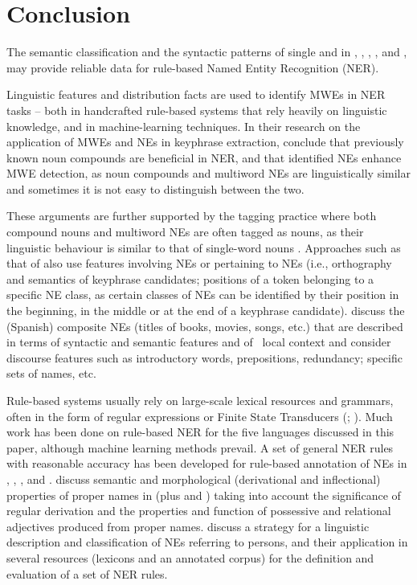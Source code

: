 \documentclass[output=paper]{langsci/langscibook}
\begin{document}
\section{Conclusion}

The semantic classification and the syntactic patterns of single and
 in , , , , and , may
provide reliable data for rule-based Named Entity Recognition (NER).



Linguistic features and distribution facts are used to identify MWEs in
NER tasks – both in handcrafted rule-based systems that rely heavily on
linguistic knowledge, and in machine-learning techniques. In their
research on the application of MWEs and NEs in keyphrase extraction,
\cite{nagy2011} conclude that previously known noun compounds are
beneficial in NER, and that identified NEs enhance MWE detection, as
noun compounds and multiword NEs are linguistically similar and
sometimes it is not easy to distinguish between the two.



These arguments are further supported by the tagging practice where both
compound nouns and multiword NEs are often tagged as nouns, as their
linguistic behaviour is similar to that of single-word nouns \citep{vincze2011}. Approaches such as that of \cite{nagy2011} also use
features involving NEs or pertaining to NEs (i.e., orthography and
semantics of keyphrase candidates; positions of a token belonging to a
specific NE class, as certain classes of NEs can be identified by their
position in the beginning, in the middle or at the end of a keyphrase
candidate). \cite{galicia2004} discuss the (Spanish) composite
NEs (titles of books, movies, songs, etc.) that are described in terms
of syntactic and semantic features and of \ local context and consider
discourse features such as introductory words, prepositions,
redundancy; specific sets of names, etc.



Rule-based systems usually rely on large-scale lexical resources and
grammars, often in the form of regular expressions or Finite State
Transducers (\citealt{savary2011}; \citealt{maurel2011}). Much work
has been done on rule-based NER for the five languages discussed in
this paper, although machine learning methods prevail. A set of general
NER rules with reasonable accuracy has been developed for rule-based
annotation of NEs in  \citep{karagiozov2012},  \citep{maurel2011},  \citep{farmakiotou2000},  and  \citep{krstev2013}. \citet{krstev2007} discuss semantic and morphological
(derivational and inflectional) properties of proper names in 
(plus  and ) taking into account the significance of
regular derivation and the properties and function of possessive and
relational adjectives produced from proper names. \cite{koeva2015} discuss a strategy for a linguistic description and
classification of  NEs referring to persons, and their
application in several resources (lexicons and an annotated corpus) for
the definition and evaluation of a set of NER rules.
\end{document}
